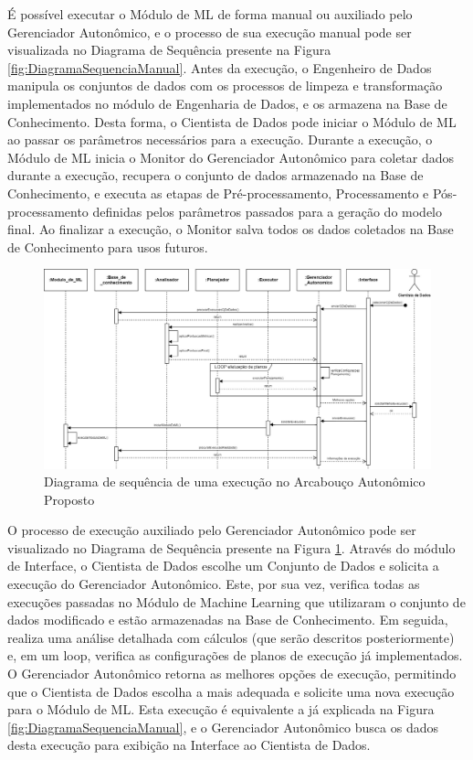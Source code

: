 \documentclass[portugues]{ic-tese}
\begin{document}
É possível executar o Módulo de ML de forma manual ou auxiliado pelo Gerenciador Autonômico, e o processo de sua execução manual pode ser visualizada no Diagrama de Sequência presente na Figura \ref{fig:DiagramaSequenciaManual}. Antes da execução, o Engenheiro de Dados manipula os conjuntos de dados com os processos de limpeza e transformação implementados no módulo de Engenharia de Dados, e os armazena na Base de Conhecimento. Desta forma, o Cientista de Dados pode iniciar o Módulo de ML ao passar os parâmetros necessários para a execução. Durante a execução, o Módulo de ML inicia o Monitor do Gerenciador Autonômico para coletar dados durante a execução, recupera o conjunto de dados armazenado na Base de Conhecimento, e executa as etapas de Pré-processamento, Processamento e Pós-processamento definidas pelos parâmetros passados para a geração do modelo final. Ao finalizar a execução, o Monitor salva todos os dados coletados na Base de Conhecimento para usos futuros.

\begin{figure}
\clearpage
\includegraphics[scale=0.445]{images/Diagrama_Sequencia_Auto.jpg}
\caption {Diagrama de sequência de uma execução no Arcabouço Autonômico Proposto}
\label{fig:DiagramaSequenciaAuto}
\end{figure}

O processo de execução auxiliado pelo Gerenciador Autonômico pode ser visualizado no Diagrama de Sequência presente na Figura \ref{fig:DiagramaSequenciaAuto}. Através do módulo de Interface, o Cientista de Dados escolhe um Conjunto de Dados e solicita a execução do Gerenciador Autonômico. Este, por sua vez, verifica todas as execuções passadas no Módulo de Machine Learning que utilizaram o conjunto de dados modificado e estão armazenadas na Base de Conhecimento. Em seguida, realiza uma análise detalhada com cálculos (que serão descritos posteriormente) e, em um loop, verifica as configurações de planos de execução já implementados. O Gerenciador Autonômico retorna as melhores opções de execução, permitindo que o Cientista de Dados escolha a mais adequada e solicite uma nova execução para o Módulo de ML. Esta execução é equivalente a já explicada na Figura \ref{fig:DiagramaSequenciaManual}, e o Gerenciador Autonômico busca os dados desta execução para exibição na Interface ao Cientista de Dados.
\end{document}
